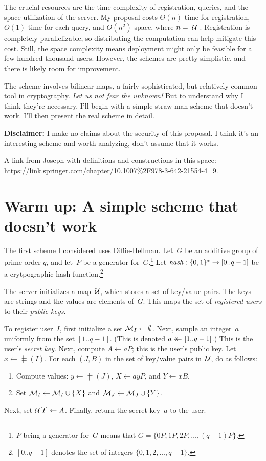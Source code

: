 \documentclass{build/llncs}
\begin{document}
The crucial resources are the time complexity of registration, queries, and the
space utilization of the server.
%
My proposal costs $\Theta(n)$ time for registration, $O(1)$ time for each query,
and $O(n^2)$ space, where $n=|\mathcal{U}|$.
%
Registration is completely parallelizable, so distributing the computation can
help mitigate this cost.
%
Still, the space complexity means deployment might only be feasible for a few
hundred-thousand users. However, the schemes are pretty simplistic, and there
is likely room for improvement.

The scheme involves bilinear maps, a fairly sophisticated, but relatively common tool
in cryptography. \textit{Let us not fear the unknown!} But to understand why I
think they're necessary, I'll begin with a simple straw-man scheme that doesn't
work. I'll then present the real scheme in detail.

\noindent
\textbf{\color{red}Disclaimer:} I make no claims about the security of this
proposal. I think it's an interesting scheme and worth analyzing, don't assume
that it works.

A link from Joseph with definitions and constructions in this space:
\url{https://link.springer.com/chapter/10.1007\%2F978-3-642-21554-4_9}.

\section*{Warm up: A simple scheme that doesn't work}

The first scheme I considered uses Diffie-Hellman.
%
Let~$G$ be an additive group of prime order $q$, and let~$P$ be a generator
for~$G$.\footnote{$P$ being a generator for~$G$ means that $G = \{ 0P, 1P, 2P,
\ldots, (q-1)P \}$.}
%
Let $\mathit{hash}:\{0,1\}^* \to [0..q-1]$ be a crytpographic hash
function.\footnote{$[0..q-1]$ denotes the set of integers $\{0, 1, 2, \ldots,
q-1\}$.}

The server initializes a map~$\mathcal{U}$, which stores a set of key/value pairs. The
keys are strings and the values are elements of~$G$. This maps the set of
\emph{registered users} to their \emph{public keys}.

%
To register user~$I$, first initialize a set $\mathcal{M}_I \gets \emptyset$.
%
Next, sample an integer~$a$ uniformly from the set
$[1..q-1]$. (This is denoted $a \mathrel{\leftarrow\mkern-14mu\leftarrow} [1..q-1]$.) This is the user's
\emph{secret
key}.
%
Next, compute $A \gets aP$; this is the user's public key.
%
Let $x \gets \hash(I)$.
%
For each $(J, B)$ in the set of key/value pairs in~$\mathcal{U}$, do as follows:
\begin{enumerate}
  \item Compute values: $y \gets \hash(J)$, $X \gets ay P$, and $Y \gets x B$.
  \item Set $\mathcal{M}_I \gets \mathcal{M}_I \cup \{X\}$ and $\mathcal{M}_J \gets \mathcal{M}_J \cup \{Y\}$.
\end{enumerate}
Next, set $\mathcal{U}[I] \gets A$.
Finally, return the secret key~$a$ to the user.
\end{document}
